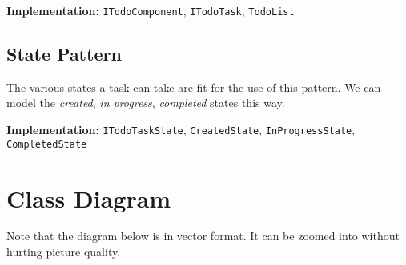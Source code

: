 \documentclass[a4paper, 12pt, titlepage]{article}
\begin{document}
  \textbf{Implementation:} \texttt{ITodoComponent}, \texttt{ITodoTask}, \texttt{TodoList}
  
  \subsection{State Pattern}
  
  The various states a task can take are fit for the use of this pattern.
  We can model the \textit{created}, \textit{in progress}, \textit{completed} states this way.
  
  \textbf{Implementation:} \texttt{ITodoTaskState}, \texttt{CreatedState}, \texttt{InProgressState},\\ \texttt{CompletedState}
  
  \pagebreak
  \section{Class Diagram}
  
  Note that the diagram below is in vector format.
  It can be zoomed into without hurting picture quality.
  
\end{document}
